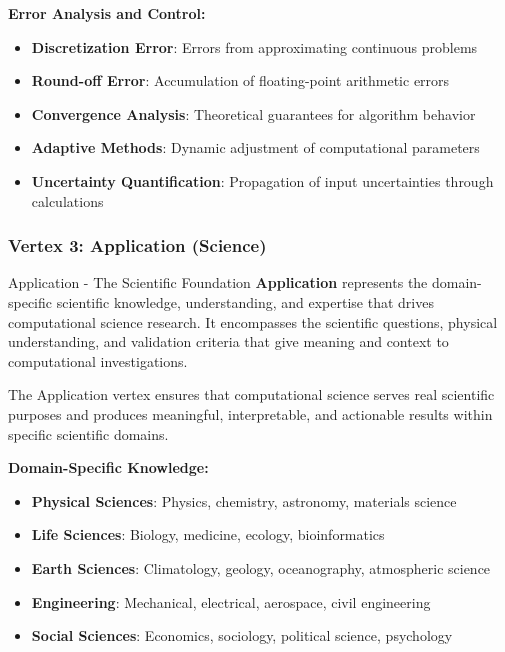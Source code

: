 \textbf{Error Analysis and Control:}
\begin{itemize}
    \item \textbf{Discretization Error}: Errors from approximating continuous problems
    \item \textbf{Round-off Error}: Accumulation of floating-point arithmetic errors
    \item \textbf{Convergence Analysis}: Theoretical guarantees for algorithm behavior
    \item \textbf{Adaptive Methods}: Dynamic adjustment of computational parameters
    \item \textbf{Uncertainty Quantification}: Propagation of input uncertainties through calculations
\end{itemize}

\subsubsection{Vertex 3: Application (Science)}

\begin{conceptcard}{Application - The Scientific Foundation}
\textbf{Application} represents the domain-specific scientific knowledge, understanding, and expertise that drives computational science research. It encompasses the scientific questions, physical understanding, and validation criteria that give meaning and context to computational investigations.
\end{conceptcard}

The Application vertex ensures that computational science serves real scientific purposes and produces meaningful, interpretable, and actionable results within specific scientific domains.

\textbf{Domain-Specific Knowledge:}
\begin{itemize}
    \item \textbf{Physical Sciences}: Physics, chemistry, astronomy, materials science
    \item \textbf{Life Sciences}: Biology, medicine, ecology, bioinformatics
    \item \textbf{Earth Sciences}: Climatology, geology, oceanography, atmospheric science
    \item \textbf{Engineering}: Mechanical, electrical, aerospace, civil engineering
    \item \textbf{Social Sciences}: Economics, sociology, political science, psychology
\end{itemize}

